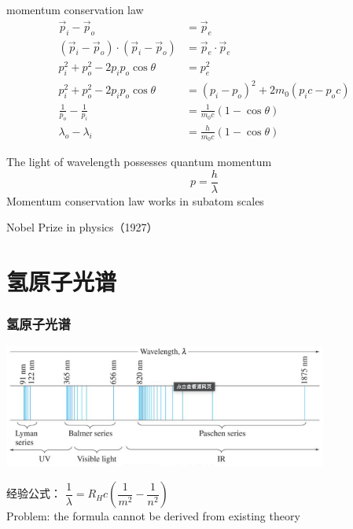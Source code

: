 \begin{frame}  
    momentum conservation law
    \begin{equation*}
        \begin{split}
            \vec{p}_i -\vec{p}_o &= \vec{p}_e \\
            (\vec{p}_i -\vec{p}_o)\cdot (\vec{p}_i -\vec{p}_o)  &= \vec{p}_e\cdot \vec{p}_e   \\
            p_i ^2 + p_o ^2 -2p_i p_o \cos \theta &= p_e ^2  \\
            p_i ^2 + p_o ^2 -2p_i p_o \cos \theta &= (p_i-p_o)^2 +2 m_0 (p_i c-p_o c) \\
            \frac{1}{p_o} -\frac{1}{p_i} &= \frac{1}{m_0 c} (1-\cos \theta) \\
            \lambda_o -\lambda_i &= \frac{h}{m_0 c} (1-\cos \theta) 
        \end{split}
    \end{equation*}
\end{frame}

\begin{frame}   
    \begin{tcolorbox}[colback=yellow!10,colframe=red!75!black,title=Significance]
        \bullet The light of wavelength \lambda possesses quantum momentum \[p=\frac{h}{\lambda}\]
        \bullet Momentum conservation law works in subatom scales 
    \end{tcolorbox}   
    {\color{deepred} Nobel Prize in physics（1927）}\\
\end{frame}

\section{氢原子光谱}
\begin{frame}  
     \frametitle{氢原子光谱}
     \begin{center}
        \includegraphics[width=0.8\textwidth]{figs/hydspe.png}
    \end{center}  
    经验公式：
       $\dfrac{1}{\lambda}=R_H c (\dfrac{1}{m^2} -\dfrac{1}{n^2})$ \\
    \alert{Problem:} the formula cannot be derived from existing theory
\end{frame}

